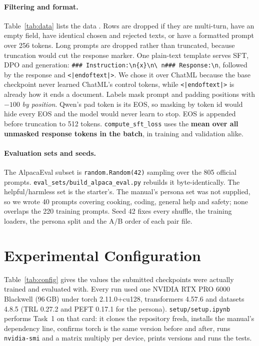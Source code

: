 \documentclass{article}
\begin{document}


\paragraph{Filtering and format.} Table~\ref{tab:data} lists the data \citep{ding2023ultrachat,bai2022hh,cui2024ultrafeedback,tunstall2023zephyr}. Rows are dropped if they are
multi-turn, have an empty field, have identical chosen and rejected texts, or have a formatted prompt over 256 tokens.
Long prompts are dropped rather than truncated, because truncation would cut the response marker. One plain-text
template serves SFT, DPO and generation: \texttt{\#\#\# Instruction:\textbackslash n\{x\}\textbackslash n\textbackslash
n\#\#\# Response:\textbackslash n}, followed by the response and \texttt{<|endoftext|>}. We chose it over ChatML
because the base checkpoint never learned ChatML's control tokens, while \texttt{<|endoftext|>} is already how it ends
a document. Labels mask prompt and padding positions with $-100$ \emph{by position}. Qwen's pad token is its EOS, so
masking by token id would hide every EOS and the model would never learn to stop. EOS is appended before truncation to
512 tokens. \texttt{compute\_sft\_loss} uses the \textbf{mean over all unmasked response tokens in the batch}, in
training and validation alike.

\paragraph{Evaluation sets and seeds.} The AlpacaEval subset \citep{li2023alpacaeval} is \texttt{random.Random(42)}
sampling over the 805 official prompts. \texttt{eval\_sets/build\_alpaca\_eval.py} rebuilds it byte-identically. The
helpful/harmless set is the starter's. The manual's persona set was not supplied, so we wrote 40 prompts covering
cooking, coding, general help and safety; none overlaps the 220 training prompts. Seed 42 fixes every shuffle, the
training loaders, the persona split and the A/B order of each pair file.

\section{Experimental Configuration}
\label{sec:config}

Table~\ref{tab:config} gives the values the submitted checkpoints were actually trained and evaluated with. Every run
used one NVIDIA RTX PRO 6000 Blackwell (96\,GB) under torch 2.11.0+cu128, transformers 4.57.6 and datasets 4.8.5 (TRL
0.27.2 and PEFT 0.17.1 for the persona). \texttt{setup/setup.ipynb} performs Task~1 on that card: it clones the
repository fresh, installs the manual's dependency line, confirms torch is the same version before and after, runs
\texttt{nvidia-smi} and a matrix multiply per device, prints versions and runs the tests.
\end{document}
